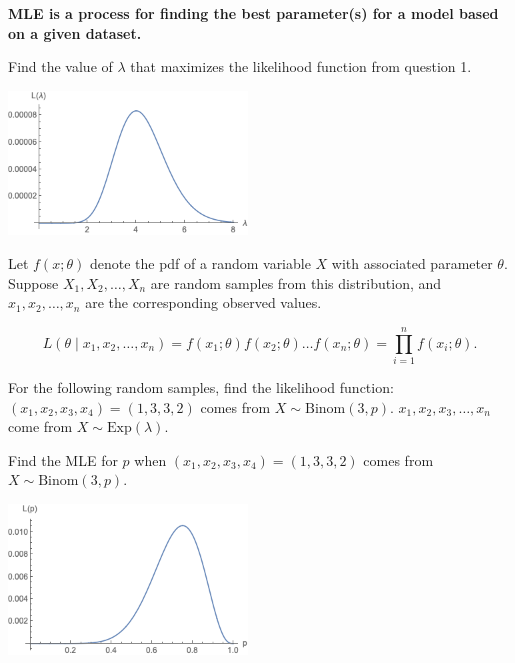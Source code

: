 \textbf{MLE is a process for finding the best parameter(s) for a model based on a given dataset. } 
\ebox

\bb[resume]
\ii Find the value of $\lambda$ that maximizes the likelihood function from question 1.
\ee

\hspace{4in} \includegraphics[width=2.5in]{14/fig-slot-mle.png}

\vfill


\clearpage



 \bbox
Let $f(x; \theta)$ denote the pdf of a random variable $X$ with associated parameter $\theta$. Suppose
$X_1, X_2, \ldots , X_n$ are random samples from this distribution, and $x_1, x_2, \ldots , x_n$ are the
corresponding observed values.

\[ L(\theta \mid x_1, x_2, \ldots , x_n) = f(x_1; \theta) f(x_2; \theta) \ldots f(x_n; \theta) = \prod_{i=1}^n f(x_i; \theta).\]
\ebox

\bb[resume]
\ii For the following random samples, find the likelihood function:
\bb
\ii $(x_1, x_2, x_3, x_4) = (1,3,3,2)$ comes from $X \sim \mbox{Binom}(3,p)$. \vfill
\ii $x_1, x_2, x_3, \ldots, x_n$ come from $X \sim \mbox{Exp}(\lambda)$.  \vfill
\ee


\clearpage


\ii Find the MLE for $p$ when  $(x_1, x_2, x_3, x_4) = (1,3,3,2)$ comes from $X \sim \mbox{Binom}(3,p)$.

\ee

\vfill

\hspace{3in} \includegraphics[width=2.5in]{14/fig-binom-mle.png}

